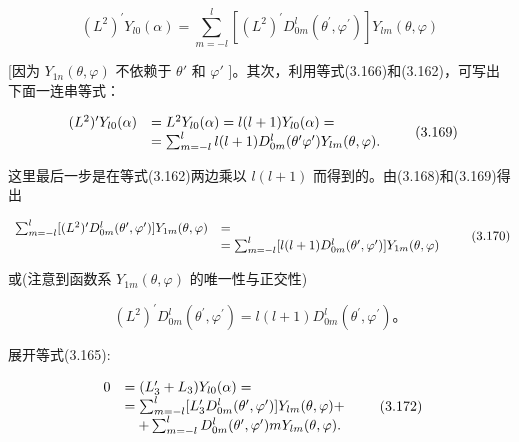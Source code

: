 \begin{equation*}
(L ^ {2}) ^ {\prime} Y _ {l 0} (\alpha) = \sum_ {m = - l} ^ {l} [ (L ^ {2}) ^ {\prime} D _ {0 m} ^ {l} (\theta^ {\prime}, \varphi^ {\prime}) ] Y _ {l m} (\theta , \varphi)\tag{3.168}
\end{equation*}

[因为 $Y_{1n}(\theta, \varphi)$ 不依赖于 $\theta'$ 和 $\varphi'$ ]。其次，利用等式(3.166)和(3.162)，可写出下面一连串等式：

\begin{equation*}
\begin{array}{r l} (L ^ {2}) ^ {\prime} Y _ {l 0} (\alpha) & = L ^ {2} Y _ {l 0} (\alpha) = l (l + 1) Y _ {l 0} (\alpha) = \\ & = \sum_ {m = - l} ^ {l} l (l + 1) D _ {0 m} ^ {l} (\theta^ {\prime} \varphi^ {\prime}) Y _ {l m} (\theta , \varphi). \end{array}\tag{3.169}
\end{equation*}

这里最后一步是在等式(3.162)两边乘以 $l(l+1)$ 而得到的。由(3.168)和(3.169)得出

\begin{equation*}
\begin{array}{r l} \sum_ {m = - l} ^ {l} [ (L ^ {2}) ^ {\prime} D _ {0 m} ^ {l} (\theta^ {\prime}, \varphi^ {\prime}) ] Y _ {1 m} (\theta , \varphi) & = \\ & = \sum_ {m = - l} ^ {l} [ l (l + 1) D _ {0 m} ^ {l} (\theta^ {\prime}, \varphi^ {\prime}) ] Y _ {1 m} (\theta , \varphi) \end{array}\tag{3.170}
\end{equation*}

或(注意到函数系 $Y_{1m}(\theta,\varphi)$ 的唯一性与正交性)

\begin{equation*}
(L ^ {2}) ^ {\prime} D _ {0 m} ^ {l} \left(\theta^ {\prime}, \varphi^ {\prime}\right) = l (l + 1) D _ {0 m} ^ {l} \left(\theta^ {\prime}, \varphi^ {\prime}\right) \text{。}\tag{3.171}
\end{equation*}

展开等式(3.165):

\begin{equation*}
\begin{array}{r l} 0 & = (L _ {3} ^ {\prime} + L _ {3}) Y _ {l 0} (\alpha) = \\ & = \sum_ {m = - l} ^ {l} [ L _ {3} ^ {\prime} D _ {0 m} ^ {l} (\theta^ {\prime}, \varphi^ {\prime}) ] Y _ {l m} (\theta , \varphi) + \\ & \quad + \sum_ {m = - l} ^ {l} D _ {0 m} ^ {l} (\theta^ {\prime}, \varphi^ {\prime}) m Y _ {l m} (\theta , \varphi). \end{array}\tag{3.172}
\end{equation*}

